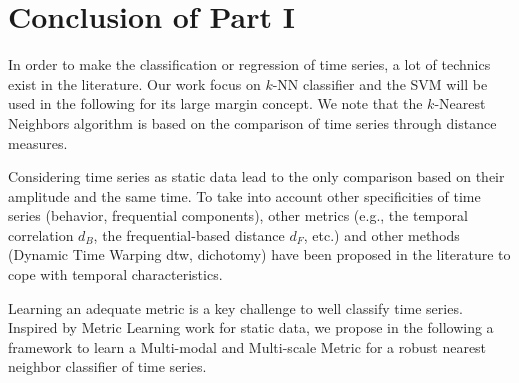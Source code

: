 \part*{Conclusion of Part I}
In order to make the classification or regression of time series, a lot of technics exist in the literature. Our work focus on $k$-NN classifier and the SVM will be used in the following for its large margin concept. We note that the $k$-Nearest Neighbors algorithm is based on the comparison of time series through distance measures. 

Considering time series as static data lead to the only comparison based on their amplitude and the same time. To take into account other specificities of time series (behavior, frequential components), other metrics (e.g., the temporal correlation $d_B$, the frequential-based distance $d_F$, etc.) and other methods (Dynamic Time Warping {\sc dtw}, dichotomy) have been proposed in the literature to cope with temporal characteristics. 

Learning an adequate metric is a key challenge to well classify time series. Inspired by Metric Learning work for static data, we propose in the following a framework to learn a Multi-modal and Multi-scale Metric for a robust nearest neighbor classifier of time series.